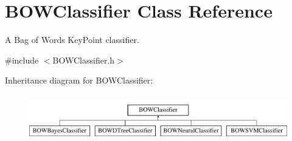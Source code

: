 \hypertarget{classBOWClassifier}{
\section{BOWClassifier Class Reference}
\label{classBOWClassifier}
}


A Bag of Words KeyPoint classifier.  




{\ttfamily \#include $<$BOWClassifier.h$>$}

Inheritance diagram for BOWClassifier:\begin{figure}[H]
\begin{center}
\leavevmode
\includegraphics[height=2cm]{classBOWClassifier}
\end{center}
\end{figure}
